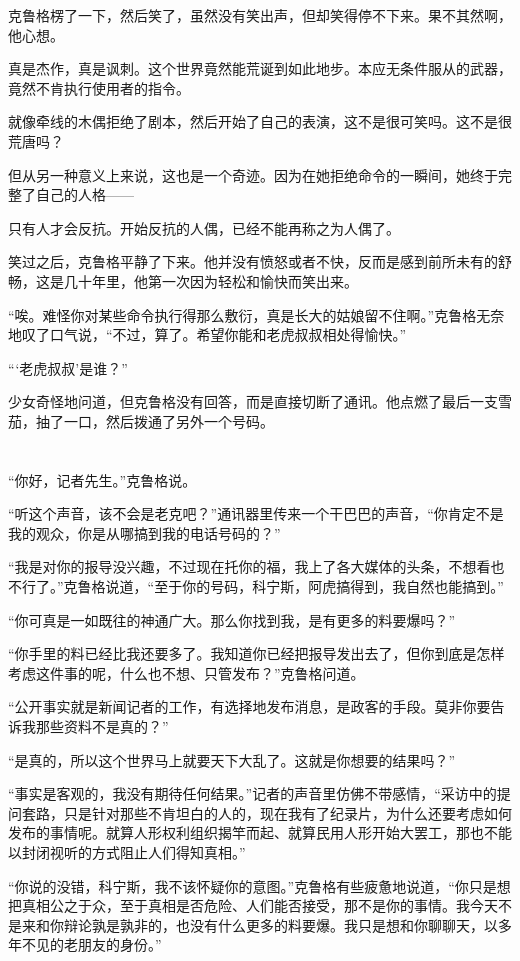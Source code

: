 克鲁格楞了一下，然后笑了，虽然没有笑出声，但却笑得停不下来。果不其然啊，他心想。

真是杰作，真是讽刺。这个世界竟然能荒诞到如此地步。本应无条件服从的武器，竟然不肯执行使用者的指令。

就像牵线的木偶拒绝了剧本，然后开始了自己的表演，这不是很可笑吗。这不是很荒唐吗？

但从另一种意义上来说，这也是一个奇迹。因为在她拒绝命令的一瞬间，她终于完整了自己的人格——

只有人才会反抗。开始反抗的人偶，已经不能再称之为人偶了。

笑过之后，克鲁格平静了下来。他并没有愤怒或者不快，反而是感到前所未有的舒畅，这是几十年里，他第一次因为轻松和愉快而笑出来。

“唉。难怪你对某些命令执行得那么敷衍，真是长大的姑娘留不住啊。”克鲁格无奈地叹了口气说，“不过，算了。希望你能和老虎叔叔相处得愉快。”

“‘老虎叔叔’是谁？”

少女奇怪地问道，但克鲁格没有回答，而是直接切断了通讯。他点燃了最后一支雪茄，抽了一口，然后拨通了另外一个号码。

\section*{}

“你好，记者先生。”克鲁格说。

“听这个声音，该不会是老克吧？”通讯器里传来一个干巴巴的声音，“你肯定不是我的观众，你是从哪搞到我的电话号码的？”

“我是对你的报导没兴趣，不过现在托你的福，我上了各大媒体的头条，不想看也不行了。”克鲁格说道，“至于你的号码，科宁斯，阿虎搞得到，我自然也能搞到。”

“你可真是一如既往的神通广大。那么你找到我，是有更多的料要爆吗？”

“你手里的料已经比我还要多了。我知道你已经把报导发出去了，但你到底是怎样考虑这件事的呢，什么也不想、只管发布？”克鲁格问道。

“公开事实就是新闻记者的工作，有选择地发布消息，是政客的手段。莫非你要告诉我那些资料不是真的？”

“是真的，所以这个世界马上就要天下大乱了。这就是你想要的结果吗？”

“事实是客观的，我没有期待任何结果。”记者的声音里仿佛不带感情，“采访中的提问套路，只是针对那些不肯坦白的人的，现在我有了纪录片，为什么还要考虑如何发布的事情呢。就算人形权利组织揭竿而起、就算民用人形开始大罢工，那也不能以封闭视听的方式阻止人们得知真相。”

“你说的没错，科宁斯，我不该怀疑你的意图。”克鲁格有些疲惫地说道，“你只是想把真相公之于众，至于真相是否危险、人们能否接受，那不是你的事情。我今天不是来和你辩论孰是孰非的，也没有什么更多的料要爆。我只是想和你聊聊天，以多年不见的老朋友的身份。”

